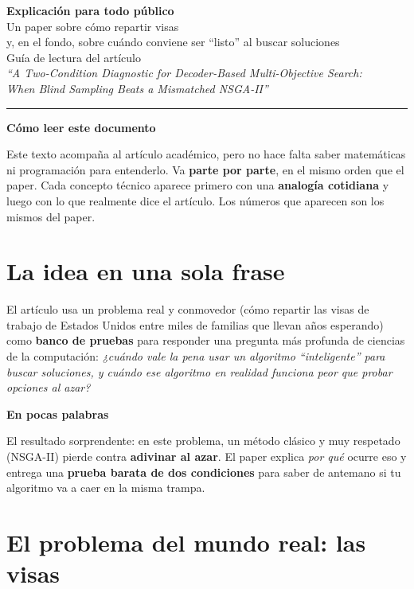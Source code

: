 \documentclass[11pt]{article}
\newcommand{\cajacolor}{cajadato}
\newenvironment{caja}[2]{%
  \par\medskip\noindent
  \renewcommand{\cajacolor}{#1}%
  \begin{lrbox}{\cajabox}%
  \begin{minipage}{\dimexpr\linewidth-2\fboxsep-1.2em\relax}%
  \setlength{\parskip}{0.5em}%
  {\bfseries\color{acento2}#2}\par\smallskip}
  {\end{minipage}%
  \end{lrbox}%
  \setlength{\fboxsep}{0.6em}%
  \colorbox{\cajacolor}{\usebox{\cajabox}}\par\medskip}
\newcommand{\enpocas}[1]{\begin{caja}{cajaclave}{En pocas palabras}#1\end{caja}}
\begin{document}
\thispagestyle{empty}

\begin{center}
{\Large\bfseries Explicación para todo público}\\[0.4em]
{\large Un paper sobre cómo repartir visas\\[0.15em]
y, en el fondo, sobre cuándo conviene ser ``listo'' al buscar soluciones}\\[1em]
{\normalsize Guía de lectura del artículo\\[0.3em]
\emph{``A Two-Condition Diagnostic for Decoder-Based Multi-Objective Search:\\
When Blind Sampling Beats a Mismatched NSGA-II''}}
\end{center}
\medskip

\noindent\textcolor{regla}{\rule{\linewidth}{1.2pt}}

\begin{caja}{cajadato}{Cómo leer este documento}
Este texto acompaña al artículo académico, pero no hace falta saber matemáticas ni programación para entenderlo. Va \textbf{parte por parte}, en el mismo orden que el paper. Cada concepto técnico aparece primero con una \textbf{analogía cotidiana} y luego con lo que realmente dice el artículo. Los números que aparecen son los mismos del paper.
\end{caja}

\section{La idea en una sola frase}

El artículo usa un problema real y conmovedor (cómo repartir las visas de trabajo de Estados Unidos entre miles de familias que llevan años esperando) como \textbf{banco de pruebas} para responder una pregunta más profunda de ciencias de la computación: \emph{¿cuándo vale la pena usar un algoritmo ``inteligente'' para buscar soluciones, y cuándo ese algoritmo en realidad funciona peor que probar opciones al azar?}

\enpocas{
El resultado sorprendente: en este problema, un método clásico y muy respetado (NSGA-II) pierde contra \textbf{adivinar al azar}. El paper explica \emph{por qué} ocurre eso y entrega una \textbf{prueba barata de dos condiciones} para saber de antemano si tu algoritmo va a caer en la misma trampa.
}

\section{El problema del mundo real: las visas}
\end{document}
